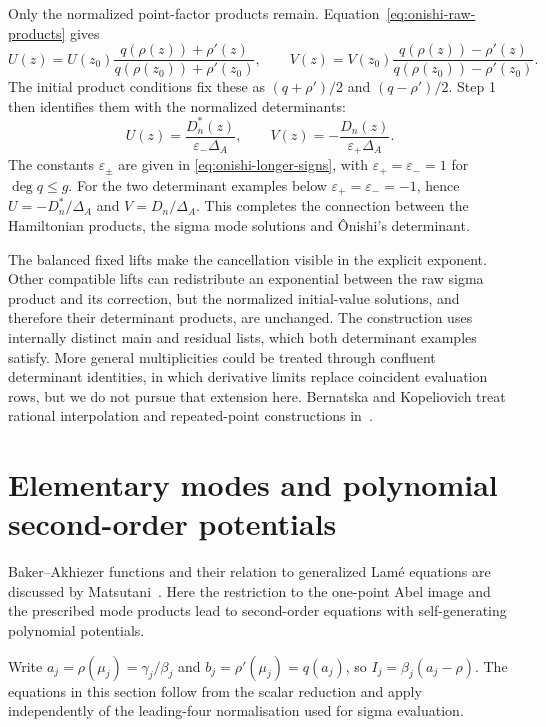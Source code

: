 \documentclass[11pt]{article}
\begin{document}
Only the normalized point-factor products remain. Equation~\eqref{eq:onishi-raw-products} gives
\[
U(z)=U(z_0)\frac{q(\rho(z))+\rho'(z)}{q(\rho(z_0))+\rho'(z_0)},\qquad
V(z)=V(z_0)\frac{q(\rho(z))-\rho'(z)}{q(\rho(z_0))-\rho'(z_0)}.
\]
The initial product conditions fix these as $(q+\rho')/2$ and $(q-\rho')/2$. Step 1 then identifies them with the normalized determinants:
\begin{equation}\label{eq:onishi-mode-products}
U(z)=\frac{D_n^*(z)}{\varepsilon_-\Delta_A},\qquad
V(z)=-\frac{D_n(z)}{\varepsilon_+\Delta_A}.
\end{equation}
The constants $\varepsilon_\pm$ are given in \eqref{eq:onishi-longer-signs}, with $\varepsilon_+=\varepsilon_-=1$ for $\deg q\le g$. For the two determinant examples below $\varepsilon_+=\varepsilon_-=-1$, hence $U=-D_n^*/\Delta_A$ and $V=D_n/\Delta_A$. This completes the connection between the Hamiltonian products, the sigma mode solutions and \^Onishi's determinant.

The balanced fixed lifts make the cancellation visible in the explicit exponent. Other compatible lifts can redistribute an exponential between the raw sigma product and its correction, but the normalized initial-value solutions, and therefore their determinant products, are unchanged. The construction uses internally distinct main and residual lists, which both determinant examples satisfy. More general multiplicities could be treated through confluent determinant identities, in which derivative limits replace coincident evaluation rows, but we do not pursue that extension here. Bernatska and Kopeliovich treat rational interpolation and repeated-point constructions in~\cite[Sections~3.3--3.5]{divisor-addition}.


\section{Elementary modes and polynomial second-order potentials}
\label{sec:polynomial-potentials}

Baker--Akhiezer functions and their relation to generalized Lam\'e
equations are discussed by Matsutani~\cite[Section~4.2.2.3]{matsutani-book}.
Here the restriction to the one-point Abel image and the prescribed mode
products lead to second-order equations with self-generating polynomial
potentials.

Write $a_j=\rho(\mu_j)=\gamma_j/\beta_j$ and
$b_j=\rho'(\mu_j)=q(a_j)$, so $I_j=\beta_j(a_j-\rho)$.
The equations in this section follow from the scalar reduction and apply
independently of the leading-four normalisation used for sigma evaluation.
\end{document}
